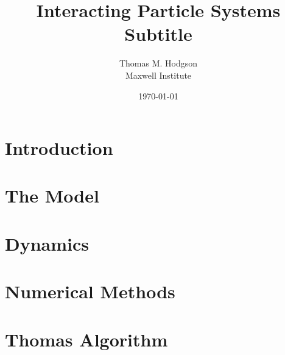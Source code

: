 \documentclass[11pt, a4paper]{article}
\title{{\huge Interacting Particle Systems} \\ \vspace{1cm} Subtitle}
\author{Thomas M. Hodgson\\ \vspace{0.5cm} Maxwell Institute}
\date{\today}
\begin{document}
	\maketitle
    \thispagestyle{empty}
	\newpage
	\tableofcontents
	\listoffigures
	\newpage   
	\section{Introduction}\label{sec:introduction}
        
    	\section{The Model}\label{sec:model}
            
    \section{Dynamics}\label{sec:dynamics}
            
    \section{Numerical Methods}\label{sec:numericalmethods}
    

\appendix
\section{Thomas Algorithm}
\end{document}
